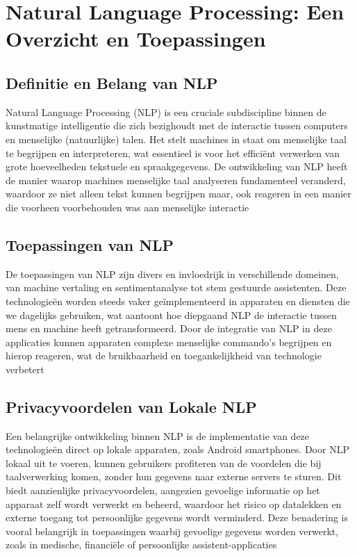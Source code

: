 \section{Natural Language Processing: Een Overzicht en Toepassingen}

\subsection{Definitie en Belang van NLP}

Natural Language Processing (NLP) is een cruciale subdiscipline binnen de kunstmatige intelligentie die zich bezighoudt met de interactie tussen computers en menselijke (natuurlijke) talen. Het stelt machines in staat om menselijke taal te begrijpen en interpreteren, wat essentieel is voor het efficiënt verwerken van grote hoeveelheden tekstuele en spraakgegevens. De ontwikkeling van NLP heeft de manier waarop machines menselijke taal analyseren fundamenteel veranderd, waardoor ze niet alleen tekst kunnen begrijpen maar, ook reageren in een manier die voorheen voorbehouden was aan menselijke interactie \autocite{Sanadi2022}

\subsection{Toepassingen van NLP}

De toepassingen van NLP zijn divers en invloedrijk in verschillende domeinen, van machine vertaling en sentimentanalyse tot stem gestuurde assistenten. Deze technologieën worden steeds vaker geïmplementeerd in apparaten en diensten die we dagelijks gebruiken, wat aantoont hoe diepgaand NLP de interactie tussen mens en machine heeft getransformeerd. Door de integratie van NLP in deze applicaties kunnen apparaten complexe menselijke commando's begrijpen en hierop reageren, wat de bruikbaarheid en toegankelijkheid van technologie verbetert \autocite{Feng2020}

\subsection{Privacyvoordelen van Lokale NLP}

Een belangrijke ontwikkeling binnen NLP is de implementatie van deze technologieën direct op lokale apparaten, zoals Android smartphones. Door NLP lokaal uit te voeren, kunnen gebruikers profiteren van de voordelen die bij taalverwerking komen, zonder hun gegevens naar externe servers te sturen. Dit biedt aanzienlijke privacyvoordelen, aangezien gevoelige informatie op het apparaat zelf wordt verwerkt en beheerd, waardoor het risico op datalekken en externe toegang tot persoonlijke gegevens wordt verminderd. Deze benadering is vooral belangrijk in toepassingen waarbij gevoelige gegevens worden verwerkt, zoals in medische, financiële of persoonlijke assistent-applicaties \autocite{Locke2021Natural}

